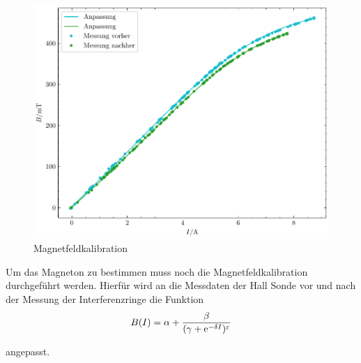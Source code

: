 \begin{figure}[htb]
    \centering
    \includegraphics[width=.6\linewidth]{../figs/BFeld-Kalibrationskurve}
    \caption{Magnetfeldkalibration}
    \label{fig:bfield_kalibration}
\end{figure}

Um das Magneton zu bestimmen muss noch die Magnetfeldkalibration durchgeführt werden. 
Hierfür wird an die Messdaten der Hall Sonde vor und nach der Messung der Interferenzringe 
die Funktion 
\begin{equation*}
    B(I) = \alpha + \frac{\beta}{(\gamma + \mathrm e^{-\delta I})^\varepsilon}
\end{equation*}

angepasst.



